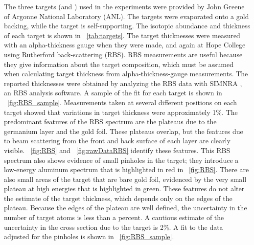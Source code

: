 The three targets (\GeTargets and ) used in the experiments were provided by John Greene of Argonne National Laboratory (ANL).  The \GeTargets targets were evaporated onto a gold backing, while the  target is self-supporting.  The isotopic abundance and thickness of each target is shown in {\tab}~\ref{tab:targets}.  The target thicknesses were measured with an alpha-thickness gauge when they were made, and again at Hope College using Rutherford back-scattering (RBS).  RBS measurements are useful because they give information about the target composition, which must be assumed when calculating target thickness from alpha-thickness-gauge measurements.  The reported thicknesses were obtained by analyzing the RBS data with SIMNRA \citep{SIMNRA}, an RBS analysis software.  A sample of the fit for each target is shown in {\fig}~\ref{fig:RBS_sample}.  Measurements taken at several different positions on each target showed that variations in target thickness were approximately 1\%.  The predominant features of the RBS spectrum are the plateaus due to the germanium layer and the gold foil.  These plateaus overlap, but the features due to beam scattering from the front and back surface of each layer are clearly visible.  {\fig}~\ref{fig:RBS} and {\fig}~\ref{fig:rawDataRBS} identify these features.  This RBS spectrum also shows evidence of small pinholes in the target; they introduce a low-energy aluminum spectrum that is highlighted in red in {\fig}~\ref{fig:RBS}.  There are also small areas of the target that are bare gold foil, evidenced by the very small plateau at high energies that is highlighted in green.  These features do not alter the estimate of the target thickness, which depends only on the edges of the plateau.  Because the edges of the plateau are well defined, the uncertainty in the number of target atoms is less than a percent.  A cautious estimate of the uncertainty in the cross section due to the target is 2\%.  A fit to the data adjusted for the pinholes is shown in {\fig}~\ref{fig:RBS_sample}. 
